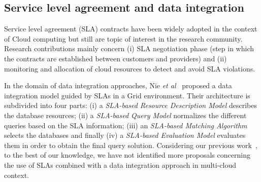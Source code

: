 \subsection{Service level agreement and data integration}
Service level agreement (SLA) contracts have been widely adopted in the context of Cloud computing but still are topic of interest in the research community.
Research contributions mainly concern (i) SLA negotiation phase (step in which the
contracts are established between customers and providers) and (ii)
monitoring and allocation of cloud resources to detect and avoid SLA
violations.

In the domain of data integration approaches, Nie \textit{et al}~\cite{Nie07} proposed a data integration model guided by SLAs in a Grid environment.
Their architecture is subdivided into four parts: (i) a \textit{SLA-based
Resource Description Model} describes the database resources; (ii)
a \textit{SLA-based Query Model} normalizes the different queries based on the
SLA information; (iii) an \textit{SLA-based Matching Algorithm}  
selects the databases and finally (iv) a \textit{SLA-based Evaluation Model}
evaluates them in order to obtain the final query solution.
Considering our previous work~\cite{012}, to the best of our knowledge, we have
not identified more proposals concerning the use of SLAs combined with a data
integration approach in multi-cloud context.
